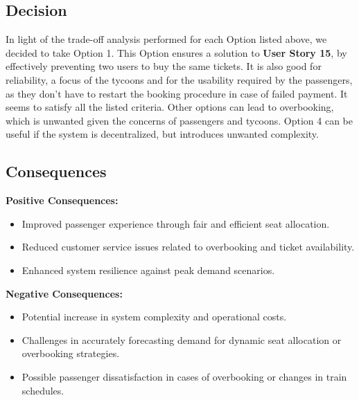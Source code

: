 \subsection*{Decision}
In light of the trade-off analysis performed for each Option listed above, we decided to take Option 1. 
This Option ensures a solution to \textbf{User Story 15}, by effectively preventing two users to buy the same tickets. 
It is also good for reliability, a focus of the tycoons and for the usability required by the passengers, as they don't have to restart the booking procedure in case of failed payment. It seems to satisfy all the listed criteria.
Other options can lead to overbooking, which is unwanted given the concerns of passengers and tycoons.
Option 4 can be useful if the system is decentralized, but introduces unwanted complexity.

\subsection*{Consequences}
\textbf{Positive Consequences:}
\begin{itemize}
    \item Improved passenger experience through fair and efficient seat allocation.
    \item Reduced customer service issues related to overbooking and ticket availability.
    \item Enhanced system resilience against peak demand scenarios.
\end{itemize}
\textbf{Negative Consequences:}%
\begin{itemize}
    \item Potential increase in system complexity and operational costs.
    \item Challenges in accurately forecasting demand for dynamic seat allocation or overbooking strategies.
    \item Possible passenger dissatisfaction in cases of overbooking or changes in train schedules.
\end{itemize}